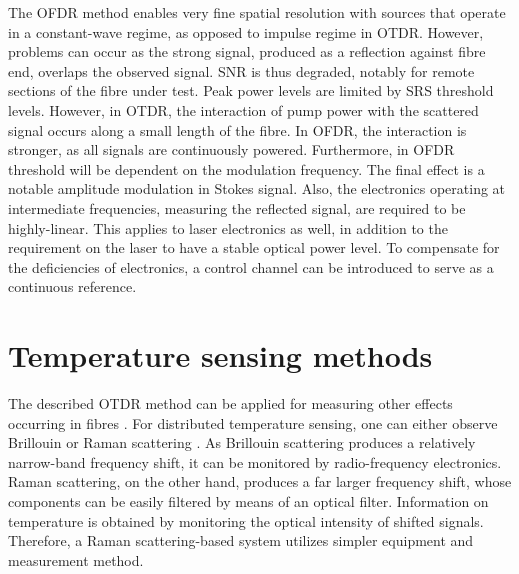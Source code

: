 \documentclass{standalone}
\begin{document}
The OFDR method enables very fine spatial resolution with sources that operate in a constant-wave regime, as opposed to impulse regime in OTDR. However, problems can occur as the strong signal, produced as a reflection against fibre end, overlaps the observed signal. SNR is thus degraded, notably for remote sections of the fibre under test. Peak power levels are limited by SRS threshold levels. However, in OTDR, the interaction of pump power with the scattered signal occurs along a small length of the fibre. In OFDR, the interaction is stronger, as all signals are continuously powered. Furthermore, in OFDR threshold will be dependent on the modulation frequency. The final effect is a notable amplitude modulation in Stokes signal. Also, the electronics operating at intermediate frequencies, measuring the reflected signal, are required to be highly-linear. This applies to laser electronics as well, in addition to the requirement on the laser to have a stable optical power level. To compensate for the deficiencies of electronics, a control channel can be introduced to serve as a continuous reference.

\section{Temperature sensing methods}

The described OTDR method can be applied for measuring other effects occurring in fibres \cite{spie1991}\cite{sensorRealization2008}. For distributed temperature sensing, one can either observe Brillouin or Raman scattering \cite{epflBookInelastic}. As Brillouin scattering produces a relatively narrow-band frequency shift, it can be monitored by radio-frequency electronics. Raman scattering, on the other hand, produces a far larger frequency shift, whose components can be easily filtered by means of an optical filter. Information on temperature is obtained by monitoring the optical intensity of shifted signals. Therefore, a Raman scattering-based system utilizes simpler equipment and measurement method. \\
\end{document}
